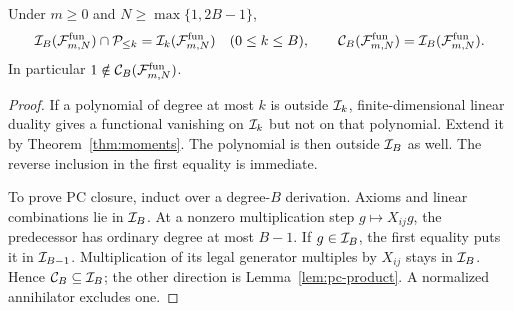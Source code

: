 \begin{corollary}\label{cor:stability}
Under \(m\ge0\) and \(N\ge\max\{1,2B-1\}\),
\begin{equation}\label{eq:old-stability}
 \mathcal I_B(\mathcal F^{\mathrm{fun}}_{m,N})\cap\mathcal P_{\le k}
       =\mathcal I_k(\mathcal F^{\mathrm{fun}}_{m,N})
       \quad(0\le k\le B),
 \qquad
 \mathcal C_B(\mathcal F^{\mathrm{fun}}_{m,N})
       =\mathcal I_B(\mathcal F^{\mathrm{fun}}_{m,N}).
\end{equation}
In particular \(1\notin\mathcal C_B(\mathcal F^{\mathrm{fun}}_{m,N})\).
\end{corollary}
\begin{proof}
If a polynomial of degree at most \(k\) is outside \(\mathcal I_k\),
finite-dimensional linear duality gives a functional vanishing on
\(\mathcal I_k\) but not on that polynomial. Extend it by
Theorem~\ref{thm:moments}. The polynomial is then outside \(\mathcal I_B\)
as well. The reverse inclusion in the first equality is immediate.

To prove PC closure, induct over a degree-\(B\) derivation.
Axioms and linear combinations lie in \(\mathcal I_B\).
At a nonzero multiplication step \(g\mapsto X_{ij}g\), the predecessor
has ordinary degree at most \(B-1\). If \(g\in\mathcal I_B\), the first
equality puts it in \(\mathcal I_{B-1}\). Multiplication of its legal
generator multiples by \(X_{ij}\) stays in \(\mathcal I_B\).
Hence \(\mathcal C_B\subseteq\mathcal I_B\); the other direction is
Lemma~\ref{lem:pc-product}.
A normalized annihilator excludes one.
\end{proof}
